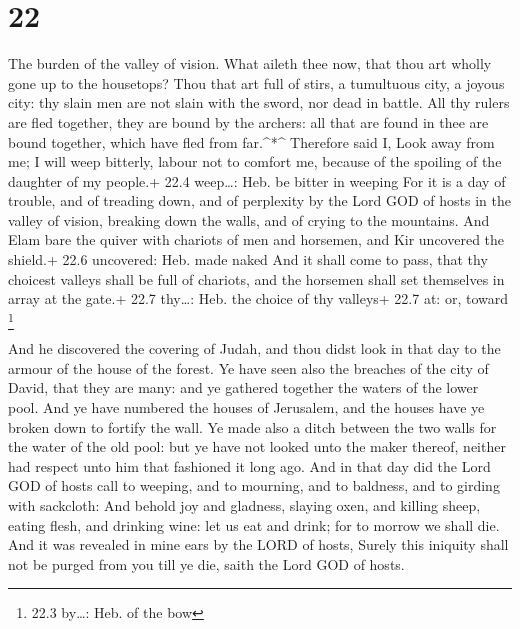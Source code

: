 \hypertarget{section-21}{%
\section{22}\label{section-21}}

 The burden of the valley of vision. What aileth thee now,
that thou art wholly gone up to the housetops?  Thou that
art full of stirs, a tumultuous city, a joyous city: thy slain men are
not slain with the sword, nor dead in battle.  All thy
rulers are fled together, they are bound by the archers: all that are
found in thee are bound together, which have fled from far.\^{}*\^{}
 Therefore said I, Look away from me; I will weep bitterly,
labour not to comfort me, because of the spoiling of the daughter of my
people.+ 22.4 weep\ldots: Heb. be bitter in weeping  For it
is a day of trouble, and of treading down, and of perplexity by the Lord
GOD of hosts in the valley of vision, breaking down the walls, and of
crying to the mountains.  And Elam bare the quiver with
chariots of men and horsemen, and Kir uncovered the shield.+ 22.6
uncovered: Heb. made naked  And it shall come to pass, that
thy choicest valleys shall be full of chariots, and the horsemen shall
set themselves in array at the gate.+ 22.7 thy\ldots: Heb. the choice of
thy valleys+ 22.7 at: or, toward \footnote{22.3 by\ldots: Heb. of the
  bow}

 And he discovered the covering of Judah, and thou didst
look in that day to the armour of the house of the forest. 
Ye have seen also the breaches of the city of David, that they are many:
and ye gathered together the waters of the lower pool.  And
ye have numbered the houses of Jerusalem, and the houses have ye broken
down to fortify the wall.  Ye made also a ditch between the
two walls for the water of the old pool: but ye have not looked unto the
maker thereof, neither had respect unto him that fashioned it long ago.
 And in that day did the Lord GOD of hosts call to weeping,
and to mourning, and to baldness, and to girding with sackcloth:
 And behold joy and gladness, slaying oxen, and killing
sheep, eating flesh, and drinking wine: let us eat and drink; for to
morrow we shall die.  And it was revealed in mine ears by
the LORD of hosts, Surely this iniquity shall not be purged from you
till ye die, saith the Lord GOD of hosts.

